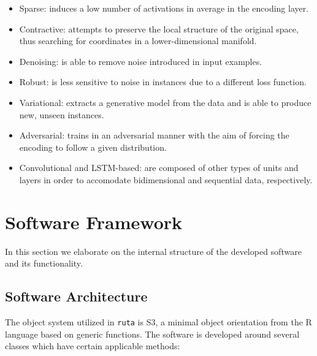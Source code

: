 \begin{itemize}
\item Sparse: induces a low number of activations in average in the encoding layer.
\item Contractive: attempts to preserve the local structure of the original space, thus searching for coordinates in a lower-dimensional manifold.
\item Denoising: is able to remove noise introduced in input examples.
\item Robust: is less sensitive to noise in instances due to a different loss function.
\item Variational: extracts a generative model from the data and is able to produce new, unseen instances.
\item Adversarial: trains in an adversarial manner with the aim of forcing the encoding to follow a given distribution.
\item Convolutional and LSTM-based: are composed of other types of units and layers in order to accomodate bidimensional and sequential data, respectively.
\end{itemize}



\section{Software Framework }
\label{p2sec.framework}

In this section we elaborate on the internal structure of the developed software and its functionality.

\subsection{Software Architecture}
\label{p2sec.architecture}


The object system utilized in \texttt{ruta} is S3, a minimal object orientation from the R language based on generic functions. The software is developed around several classes which have certain applicable methods:

